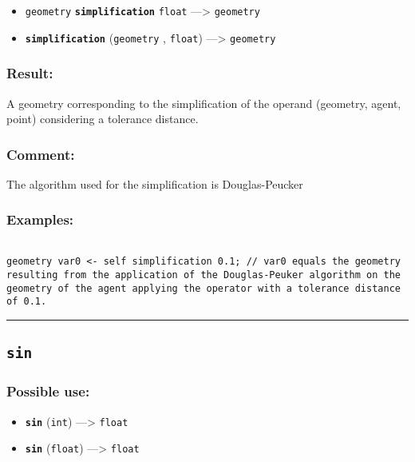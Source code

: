 \documentclass[]{book}
\providecommand{\tightlist}{%
  \setlength{\itemsep}{0pt}\setlength{\parskip}{0pt}}
\theoremstyle{definition}
\theoremstyle{definition}
\theoremstyle{definition}
\theoremstyle{remark}
\begin{document}
\begin{itemize}
\tightlist
\item
  \texttt{geometry} \textbf{\texttt{simplification}} \texttt{float}
  ---\textgreater{} \texttt{geometry}
\item
  \textbf{\texttt{simplification}} (\texttt{geometry} , \texttt{float})
  ---\textgreater{} \texttt{geometry}
\end{itemize}

\subsubsection{Result:}\label{result-459}

A geometry corresponding to the simplification of the operand (geometry,
agent, point) considering a tolerance distance.

\subsubsection{Comment:}\label{comment-88}

The algorithm used for the simplification is Douglas-Peucker

\subsubsection{Examples:}\label{examples-331}

\begin{verbatim}
 
geometry var0 <- self simplification 0.1; // var0 equals the geometry resulting from the application of the Douglas-Peuker algorithm on the geometry of the agent applying the operator with a tolerance distance of 0.1.
\end{verbatim}

\begin{center}\rule{0.5\linewidth}{\linethickness}\end{center}

\subsection{\texorpdfstring{\texttt{sin}}{sin}}\label{sin}

\subsubsection{Possible use:}\label{possible-use-476}

\begin{itemize}
\tightlist
\item
  \textbf{\texttt{sin}} (\texttt{int}) ---\textgreater{} \texttt{float}
\item
  \textbf{\texttt{sin}} (\texttt{float}) ---\textgreater{}
  \texttt{float}
\end{itemize}
\end{document}

